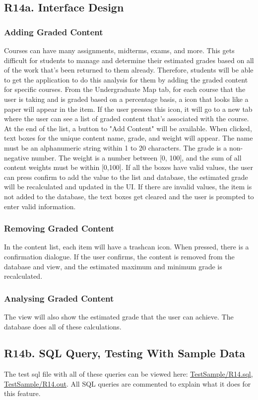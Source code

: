 \documentclass[12pt, a4paper]{article}
\begin{document}
\subsection*{R14a. Interface Design}
\subsubsection*{Adding Graded Content}
Courses can have many assignments, midterms, exams, and more. This gets difficult for students to manage and determine their estimated grades based on all of the work that's been returned to them already. Therefore, students will be able to get the application to do this analysis for them by adding the graded content for specific courses. From the Undergraduate Map tab, for each course that the user is taking and is graded based on a percentage basis, a icon that looks like a paper will appear in the item. If the user presses this icon, it will go to a new tab where the user can see a list of graded content that's associated with the course. At the end of the list, a button to "Add Content" will be available. When clicked, text boxes for the unique content name, grade, and weight will appear. The name must be an alphanumeric string within 1 to 20 characters. The grade is a non-negative number. The weight is a number between [0, 100], and the sum of all content weights must be within [0,100]. If all the boxes have valid values, the user can press confirm to add the value to the list and database, the estimated grade will be recalculated and updated in the UI. If there are invalid values, the item is not added to the database, the text boxes get cleared and the user is prompted to enter valid information.
\subsubsection*{Removing Graded Content}
In the content list, each item will have a trashcan icon. When pressed, there is a confirmation dialogue. If the user confirms, the content is removed from the database and view, and the estimated maximum and minimum grade is recalculated.
\subsubsection*{Analysing Graded Content}
The view will also show the estimated grade that the user can achieve. The database does all of these calculations.
\subsection*{R14b. SQL Query, Testing With Sample Data}
The test sql file with all of these queries can be viewed here: \underline{\href{https://github.com/Kggupta/DegreeMap/tree/main/Database/Queries/TestSample}{TestSample/R14.sql}}, \underline{\href{https://github.com/Kggupta/DegreeMap/tree/main/Database/Queries/TestSample}{TestSample/R14.out}}. All SQL queries are commented to explain what it does for this feature.
\end{document}
